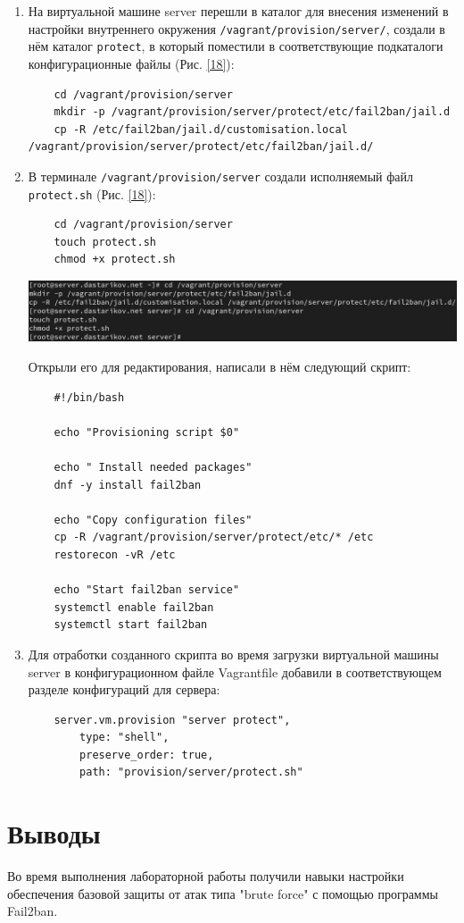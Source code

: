\begin{enumerate}
\item На виртуальной машине server перешли в каталог для внесения изменений в настройки внутреннего окружения {\tt /vagrant/provision/server/}, создали в нём каталог {\tt protect}, в который поместили в соответствующие подкаталоги конфигурационные файлы (Рис. \ref{18}):
\begin{verbatim}
    cd /vagrant/provision/server
    mkdir -p /vagrant/provision/server/protect/etc/fail2ban/jail.d
    cp -R /etc/fail2ban/jail.d/customisation.local /vagrant/provision/server/protect/etc/fail2ban/jail.d/
\end{verbatim}

\item В терминале {\tt /vagrant/provision/server} создали исполняемый файл {\tt protect.sh} (Рис. \ref{18}):

\begin{verbatim}
    cd /vagrant/provision/server
    touch protect.sh
    chmod +x protect.sh
\end{verbatim}


  \begin{center}
    \centering
    \includegraphics[width=\textwidth]{../images/image18.png}
    \label{18}
  \end{center}

  Открыли его для редактирования, написали в нём следующий скрипт:

\begin{verbatim}
    #!/bin/bash

    echo "Provisioning script $0"

    echo " Install needed packages"
    dnf -y install fail2ban

    echo "Copy configuration files"
    cp -R /vagrant/provision/server/protect/etc/* /etc
    restorecon -vR /etc

    echo "Start fail2ban service"
    systemctl enable fail2ban
    systemctl start fail2ban
\end{verbatim}

\item Для отработки созданного скрипта во время загрузки виртуальной машины server в конфигурационном файле Vagrantfile добавили в соответствующем разделе конфигураций для сервера:

\begin{verbatim}
    server.vm.provision "server protect",
        type: "shell",
        preserve_order: true,
        path: "provision/server/protect.sh"
\end{verbatim}
\end{enumerate}


\section{Выводы}
Во время выполнения лабораторной работы получили навыки настройки обеспечения базовой защиты от атак типа "brute force" с помощью программы Fail2ban.

